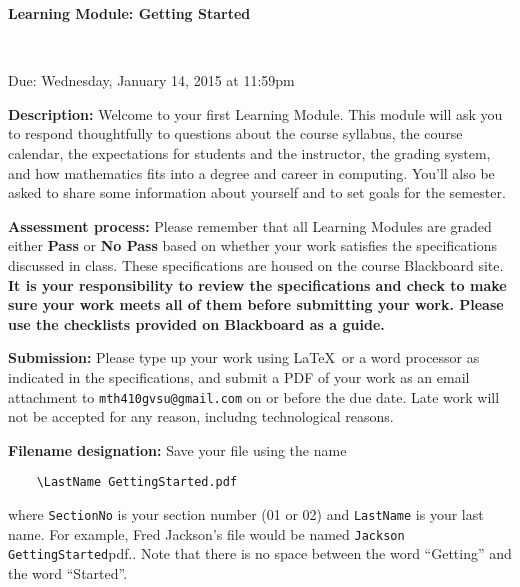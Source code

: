 \documentclass[11pt,letterpaper]{article}
\begin{document}
\begin{center}
	\begin{Large}
		\textbf{Learning Module: Getting Started} 
	\end{Large} \\
	\begin{large}
		Due: Wednesday, January 14, 2015 at 11:59pm 
	\end{large}
\end{center}

\textbf{Description:} Welcome to your first Learning Module. This module will ask you to respond thoughtfully to questions about the course syllabus, the course calendar, the expectations for students and the instructor, the grading system, and how mathematics fits into a degree and career in computing. You'll also be asked to share some information about yourself and to set goals for the semester. 

\smallskip




\smallskip

\textbf{Assessment process:} Please remember that all Learning Modules are graded either \textbf{Pass} or \textbf{No Pass} based on whether your work satisfies the specifications discussed in class. These specifications are housed on the course Blackboard site. \textbf{It is your responsibility to review the specifications and check to make sure your work meets all of them before submitting your work. Please use the checklists provided on Blackboard as a guide.} 

\smallskip

\textbf{Submission:} Please type up your work using \LaTeX \, or a word processor as indicated in the specifications, and submit a PDF of your work as an email attachment to \texttt{mth410gvsu@gmail.com} on or before the due date. Late work will not be accepted for any reason, includng technological reasons. 

\smallskip

\textbf{Filename designation:} Save your file using the name
\begin{verbatim}
	\LastName GettingStarted.pdf
\end{verbatim}
where \verb.SectionNo. is your section number (01 or 02) and \verb.LastName. is your last name. For example, Fred Jackson's file would be named \verb.Jackson GettingStarted.pdf.. Note that there is no space between the word ``Getting'' and the word ``Started''. 
\end{document}
